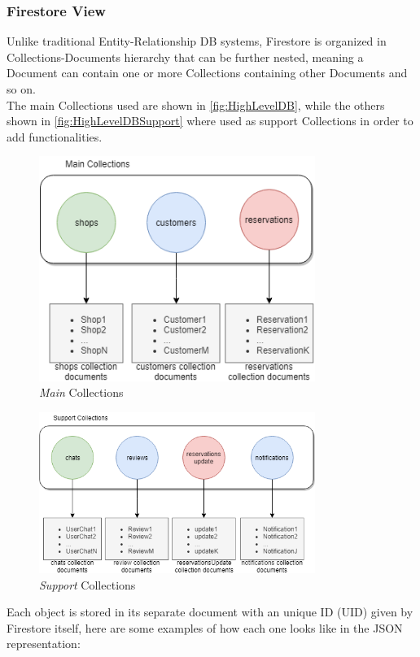 \subsubsection{Firestore View}
Unlike traditional Entity-Relationship DB systems, Firestore is organized in Collections-Documents hierarchy that can be further nested, meaning a Document can contain one or more Collections containing other Documents and so on.\\
The main Collections used are shown in \autoref{fig:HighLevelDB}, while the others shown in \autoref{fig:HighLevelDBSupport} where used as support Collections in order to add functionalities.

\begin{figure}[H]
\centering
	\includegraphics[width = 0.8\textwidth, keepaspectratio = true]{Img/HighLevelDB}
	\caption{\emph{Main} Collections}
	\label{fig:HighLevelDB}
\end{figure}

\begin{figure}[H]
\centering
	\includegraphics[width = 0.8\textwidth, keepaspectratio = true]{Img/HighLevelDBSupport}
	\caption{\emph{Support} Collections}
	\label{fig:HighLevelDBSupport}
\end{figure}
\clearpage
\noindent Each object is stored in its separate document with an unique ID (UID) given by Firestore itself, here are some examples of how each one looks like in the JSON representation:

